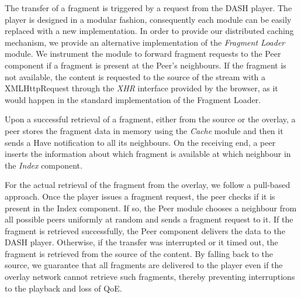 \documentclass{sig-alternate}
\begin{document}
The transfer of a fragment is triggered by a request from the DASH player. The player is
designed in a modular fashion, consequently each module can be easily replaced with a new
implementation. In order to provide our distributed caching mechanism, we provide an
alternative implementation of the \textit{Fragment Loader} module. We instrument the
module to forward fragment requests to the Peer component if a fragment is present at the
Peer's neighbours. If the fragment is not available, the content is requested to the
source of the stream with a XMLHttpRequest through the \textit{XHR} interface provided
by the browser, as it would happen in the standard implementation of the Fragment Loader.

Upon a successful retrieval of a fragment, either from the source or the overlay, a peer
stores the fragment data in memory using the \textit{Cache} module and then it sends a
Have notification to all its neighbours. On the receiving end, a peer inserts the
information about which fragment is available at which neighbour in the \textit{Index}
component.

For the actual retrieval of the fragment from the overlay, we follow a pull-based
approach. Once the player issues a fragment request, the peer checks if it is present in
the Index component. If so, the Peer module chooses a neighbour from all possible peers
uniformly at random and sends a fragment request to it. If the fragment is retrieved
successfully, the Peer component delivers the data to the DASH player. Otherwise, if the
transfer was interrupted or it timed out, the fragment is retrieved from the source of the
content. By falling back to the source, we guarantee that all fragments are delivered to
the player even if the overlay network cannot retrieve such fragments, thereby preventing
interruptions to the playback and loss of QoE.



\end{document}
